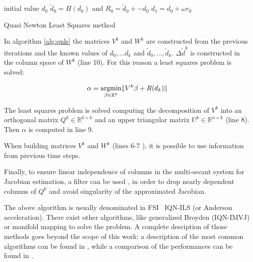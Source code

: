 \begin{algorithm}[H]
	\SetAlgoLined
	initial value $d_0$\;
	$\tilde{d}_0 = H(d_0)$ and $R_0 = \tilde{d}_0 +- d_0$\;
	$d_1 = d_0 + \omega r_0$\;
	\label{alg:qnls}
	\caption{Quasi Newton Least Squares method}
\end{algorithm}

In algorithm \ref{alg:qnls} the matrices $V^k$ and $W^k$ are constructed from the previous iterations and the known values of $d_0, \ldots d_k$ and $\tilde{d}_0, \ldots, \tilde{d}_k$. $\Delta \tilde{d}^k$ is constructed in the column space of $W^k$ (line 10). For this reason a least squares problem is solved:

\begin{equation}
	\alpha = \operatorname*{argmin}_{\beta \in \mathbb{R}^k} \lVert V^k\beta + R(d_k) \rVert
\end{equation}

The least squares problem is solved  computing the decomposition of $V^k$ into an orthogonal matrix $Q^k \in \mathbb{R}^{k \times k} $ and an upper triangular matrix $U^k \in \mathbb{R}^{n \times k}$ (line 8). Then $\alpha$ is computed in line 9.

When building matrices $V^k$ and $W^k$ (lines 6-7 ), it is possible to use information from previous time steps.

Finally, to ensure linear independence of columns in the multi-secant system for Jacobian estimation, a filter can be used \cite{haelterman2016improving}, in order to drop nearly dependent columns of $Q^k$ and avoid singularity of the approximated Jacobian.

The above algorithm is usually denominated in FSI  ~\ac{IQN-ILS} (or Anderson acceleration). There exist other algorithms, like generalized Broyden (IQN-IMVJ) or manifold mapping to solve the problem. A complete desciption of those methods goes beyond the scope of this work: a description of the most common algorithms can be found in \cite{blom2016review}, while a comparison of the performances can be found in \cite{lindner2015comparison}.


